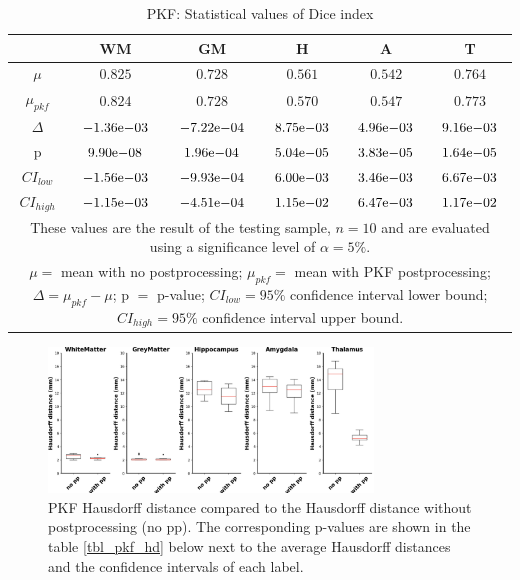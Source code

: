 \documentclass[journal]{IEEEtran}
\begin{document}
\begin{table}[ht]
\renewcommand{\arraystretch}{1.4}
\caption{PKF: Statistical values of Dice index}
\label{tbl_pkf_dice}
\centering
\tabcolsep=0.11cm
\begin{tabular}{c|c|c|c|c|c}
\hline
 & WM & GM & H & A & T\\
\hline
$\mu$&$0.825$&$0.728$&$0.561$&$0.542$&$0.764$\\
$\mu_{pkf}$&$0.824$&$0.728$&$0.570$&$0.547$&$0.773$\\
$\Delta$&${-1.36}\mathrm{e}{-03}$&${-7.22}\mathrm{e}{-04}$&${8.75}\mathrm{e}{-03}$&${4.96}\mathrm{e}{-03}$&$9{.16}\mathrm{e}{-03}$\\
p&$	{9.90}\mathrm{e}{-08}$&${1.96}\mathrm{e}{-04}$&${5.04}\mathrm{e}{-05}$&$	{3.83}\mathrm{e}{-05}$&${1.64}\mathrm{e}{-05}$\\
$CI_{low}$&${-1.56}\mathrm{e}{-03}$&${-9.93}\mathrm{e}{-04}$&${6.00}\mathrm{e}{-03}$&$	{3.46}\mathrm{e}{-03}$&${6.67}\mathrm{e}{-03}$\\
$CI_{high}$&$	{-1.15}\mathrm{e}{-03}$&${-4.51}\mathrm{e}{-04}$&${1.15}\mathrm{e}{-02}$&$	{6.47}\mathrm{e}{-03}$&${1.17}\mathrm{e}{-02}$\\
\hline
\multicolumn{6}{p{3.4in}}{These values are the result of the testing sample, $n=10$ and are evaluated using a significance level of $\alpha = 5\%$. }\\
\multicolumn{6}{p{3.4in}}{$\mu=$ mean with no postprocessing; $\mu_{pkf}=$ mean with PKF postprocessing; $\Delta=\mu_{pkf}-\mu$; p $=$ p-value;  $CI_{low}= 95\%$ confidence interval lower bound; $CI_{high}= 95\%$ confidence interval upper bound.}\\

\end{tabular}
\end{table}


\begin{figure}[ht]
\centering
\includegraphics[width=3.4in]{MIALab_Report/img/boxplots/PKF-HD.png}
\caption{PKF Hausdorff distance compared to the Hausdorff distance without postprocessing (no pp). The corresponding p-values are shown in the table \ref{tbl_pkf_hd} below next to the average Hausdorff distances and the confidence intervals of each label.}
\label{fig_pkf-hd}
\end{figure}
\end{document}
